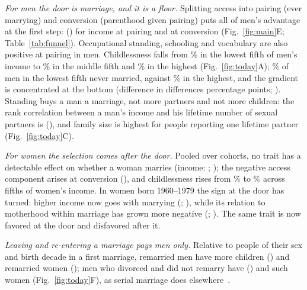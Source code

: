 \emph{For men the door is marriage, and it is a floor.} Splitting access into pairing (ever marrying) and conversion
(parenthood given pairing) puts all of men's advantage at the first step: \GssIncMPair{} (\GssIncMPairCI) for income at
pairing and \GssIncMConv{} at conversion (Fig.~\ref{fig:main}E; Table~\ref{tab:funnel}). Occupational standing, schooling
and vocabulary are also positive at pairing in men. Childlessness falls from \GssQfMOne\% in the lowest fifth of men's
income to \GssQfMThree\% in the middle fifth and \GssQfMFive\% in the highest (Fig.~\ref{fig:today}A); \GssNmMOne\% of men
in the lowest fifth never married, against \GssNmMFive\% in the highest, and the gradient is concentrated at the bottom
(difference in differences \GssFloorM{} percentage points; \GssFloorMCI). Standing buys a man a marriage, not more partners
and not more children: the rank correlation between a man's income and his lifetime number of sexual partners is
\GssPartIncM{} (\GssPartIncMCI), and family size is highest for people reporting one lifetime partner
(Fig.~\ref{fig:today}C).

\emph{For women the selection comes after the door.} Pooled over cohorts, no trait has a detectable effect on whether a
woman marries (income: \GssIncWPair; \GssIncWPairCI); the negative access component arises at conversion (\GssIncWConv),
and childlessness rises from \GssQfWOne\% to \GssQfWFive\% across fifths of women's income. In women born 1960--1979 the
sign at the door has turned: higher income now goes with marrying (\GssPairWNew; \GssPairWNewCI), while its relation to
motherhood within marriage has grown more negative (\GssConvWNew; \GssConvWNewCI). The same trait is now favored at the
door and disfavored after it.

\emph{Leaving and re-entering a marriage pays men only.} Relative to people of their sex and birth decade in a first
marriage, remarried men have \GssRemM{} more children (\GssRemMCI) and remarried women \GssRemW{} (\GssRemWCI); men who
divorced and did not remarry have \GssDivM{} (\GssDivMCI) and such women \GssDivW{} (Fig.~\ref{fig:today}F), as serial
marriage does elsewhere~\cite{jokela2010}.

